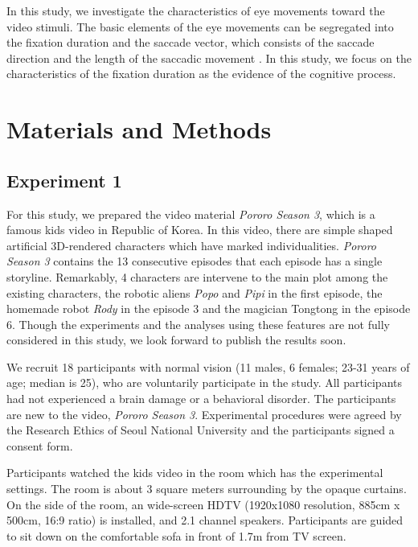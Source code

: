 \documentclass[10pt,letterpaper]{article}
\begin{document}
In this study, we investigate the characteristics of eye movements toward the video stimuli. The basic elements of the eye movements can be segregated into the fixation duration and the saccade vector, which consists of the saccade direction and the length of the saccadic movement \cite{Findlay1999,Feng2006}. In this study, we focus on the characteristics of the fixation duration as the evidence of the cognitive process.

\section{Materials and Methods}
\label{sec:material-and-methods}

\subsection{Experiment 1}

For this study, we prepared the video material \textit{Pororo Season 3}, which is a famous kids video in Republic of Korea. In this video, there are simple shaped artificial 3D-rendered characters which have marked individualities. \textit{Pororo Season 3} contains the 13 consecutive episodes that each episode has a single storyline. Remarkably, 4 characters are intervene to the main plot among the existing characters, the robotic aliens \textit{Popo} and \textit{Pipi} in the first episode, the homemade robot \textit{Rody} in the episode 3 and the magician Tongtong in the episode 6. Though the experiments and the analyses using these features are not fully considered in this study, we look forward to publish the results soon. 

We recruit 18 participants with normal vision (11 males, 6 females; 23-31 years of age; median is 25), who are voluntarily participate in the study. All participants had not experienced a brain damage or a behavioral disorder. The participants are new to the video, \textit{Pororo Season 3}. Experimental procedures were agreed by the Research Ethics of Seoul National University and the participants signed a consent form.

Participants watched the kids video in the room which has the experimental settings. The room is about 3 square meters surrounding by the opaque curtains. On the side of the room, an wide-screen HDTV (1920x1080 resolution, 885cm x 500cm, 16:9 ratio) is installed, and 2.1 channel speakers. Participants are guided to sit down on the comfortable sofa in front of 1.7m from TV screen.
\end{document}
